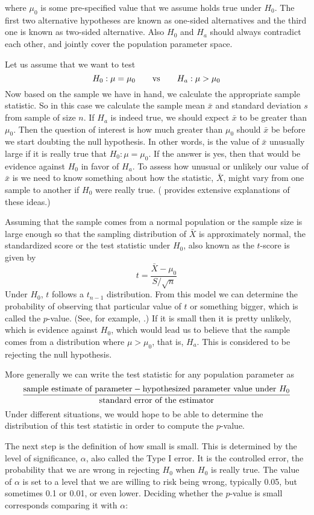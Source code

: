 \noindent where $\mu_0$ is some pre-specified value that we assume holds true under $H_0$. The first two alternative hypotheses are known as one-sided alternatives and the third one is known as two-sided alternative. Also $H_0$ and $H_a$ should always contradict each other, and jointly cover the population parameter space.

Let us assume that we want to test $$H_0: \mu = \mu_0 \qquad \hbox{vs} \qquad H_a: \mu > \mu_0$$
Now based on the sample we have in hand, we calculate the appropriate sample statistic. So in this case we calculate the sample mean $\bar{x}$ and standard deviation $s$ from sample of size $n$. If $H_a$ is indeed true, we should expect $\bar{x}$ to be greater than $\mu_0$. Then the question of interest is how much greater than $\mu_0$ should $\bar{x}$ be before we start doubting the null hypothesis. In other words, is the value of $\bar{x}$ unusually large if it is really true that $H_0: \mu = \mu_0$. If the answer is yes, then that would be evidence against $H_0$ in favor of $H_a$. To assess how unusual or unlikely our value of $\bar{x}$ is we need to know something about how the statistic, $\bar{X}$, might vary from one sample to another if $H_0$ were really true.  (\cite{kutner:2005} provides extensive explanations of these ideas.)

Assuming that the sample comes from a normal population or the sample size is large enough so that the sampling distribution of $\bar{X}$ is approximately normal, the standardized score or the test statistic under $H_0$, also known as the $t$-score is given by
$$t = \frac{\bar{X} - \mu_0}{S/\sqrt{n}}$$
Under $H_0$, $t$ follows a $t_{n-1}$ distribution. From this model we can determine the probability of observing that particular value of $t$ or something bigger, which is called the $p$-value. (See, for example, \cite{moore:2009}.) If it is small then it is pretty unlikely, which is evidence against $H_0$, which would lead us to believe that the sample comes from a distribution where $\mu>\mu_0$, that is, $H_a$. This is considered to be rejecting the null hypothesis.

More generally we can write the test statistic for any population parameter as 
$$\frac{\hbox{sample estimate of parameter} - \hbox{hypothesized parameter value under }H_0 }{\hbox{standard error of the estimator}}$$ 
Under different situations, we would hope to be able to determine the distribution of this test statistic in order to compute the $p$-value. 

The next step is the definition of how small is small. This is determined by the level of significance, $\alpha$, also called the Type I error. It is the controlled error, the probability that we are wrong in rejecting $H_0$ when $H_0$ is really true. The value of $\alpha$ is set to a level that we are willing to risk being wrong, typically 0.05, but sometimes 0.1 or 0.01, or even lower. Deciding whether the $p$-value is small corresponds comparing it with $\alpha$:
 
